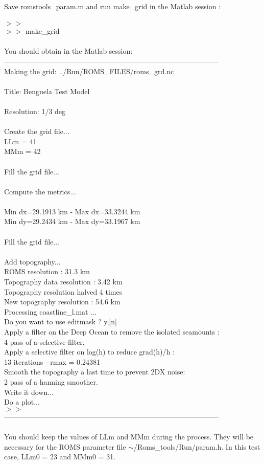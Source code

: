 Save romstools\_param.m and run make\_grid in the Matlab session :
\\ \\ 
$>>$\\
$>>$ make\_grid \\
 \\
You should obtain in the Matlab session:\\
------------------------------------------------------------------------------------------\\
Making the grid: ../Run/ROMS\_FILES/roms\_grd.nc \\
\\
Title: Benguela Test Model \\
\\
Resolution: 1/3 deg \\
\\
Create the grid file... \\
LLm = 41 \\
MMm = 42 \\
\\
Fill the grid file... \\
\\
Compute the metrics... \\
\\
Min dx=29.1913 km - Max dx=33.3244 km \\
Min dy=29.2434 km - Max dy=33.1967 km \\
\\
Fill the grid file... \\
\\
Add topography... \\
  ROMS resolution : 31.3 km \\
  Topography data resolution :  3.42 km \\
  Topography resolution halved 4 times \\
   New topography resolution :  54.6 km \\
Processing coastline\_l.mat ... \\
Do you want to use editmask ? y,[n]\\
 Apply a filter on the Deep Ocean to remove the isolated seamounts :\\
   4 pass of a selective filter.\\
 Apply a selective filter on log(h) to reduce grad(h)/h :\\
   13 iterations - rmax = 0.24381\\
 Smooth the topography a last time to prevent 2DX noise:\\
   2 pass of a hanning smoother.\\
 Write it down...\\
 Do a plot...\\
 $>>$\\
 ------------------------------------------------------------------------------------------\\
\\
You should keep the values of LLm and MMm during the process.
They will be necessary for the ROMS parameter file  
$\sim$/Roms\_tools/Run/param.h. In this test case,
LLm0 = 23 and MMm0 = 31. 

